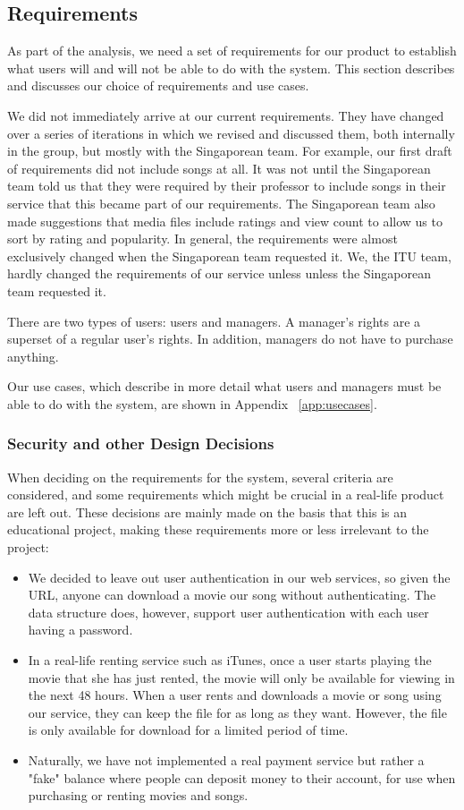 \subsection{Requirements}
As part of the analysis, we need a set of requirements for our product to establish what users will and will not be able to do with the system. This section describes and discusses our choice of requirements and use cases.


We did not immediately arrive at our current requirements. They have changed over a series of iterations in which we revised and discussed them, both internally in the group, but mostly with the Singaporean team. 
For example, our first draft of requirements did not include songs at all. It was not until the Singaporean team told us that they were required by their professor to include songs in their service that this became part of our requirements. The Singaporean team also made suggestions that media files include ratings and view count to allow us to sort by rating and popularity. In general, the requirements were almost exclusively changed when the Singaporean team requested it. We, the ITU team, hardly changed the requirements of our service unless unless the Singaporean team requested it.


There are two types of users: users and managers. A manager’s rights are a superset of a regular user’s rights. In addition, managers do not have to purchase anything.


Our use cases, which describe in more detail what users and managers must be able to do with the system, are shown in Appendix ~\ref{app:usecases}.

\subsubsection{Security and other Design Decisions}
When deciding on the requirements for the system, several criteria are considered, and some requirements which might be crucial in a real-life product are left out. These decisions are mainly made on the basis that this is an educational project, making these requirements more or less irrelevant to the project:
\begin{itemize}
\item We decided to leave out user authentication in our web services, so given the URL, anyone can download a movie our song without authenticating. The data structure does, however, support user authentication with each user having a password.
\item In a real-life renting service such as iTunes, once a user starts playing the movie that she has just rented, the movie will only be available for viewing in the next 48 hours. When a user rents and downloads a movie or song using our service, they can keep the file for as long as they want. However, the file is only available for download for a limited period of time.
\item Naturally, we have not implemented a real payment service but rather a "fake" balance where people can deposit money to their account, for use when purchasing or renting movies and songs.
\end{itemize}